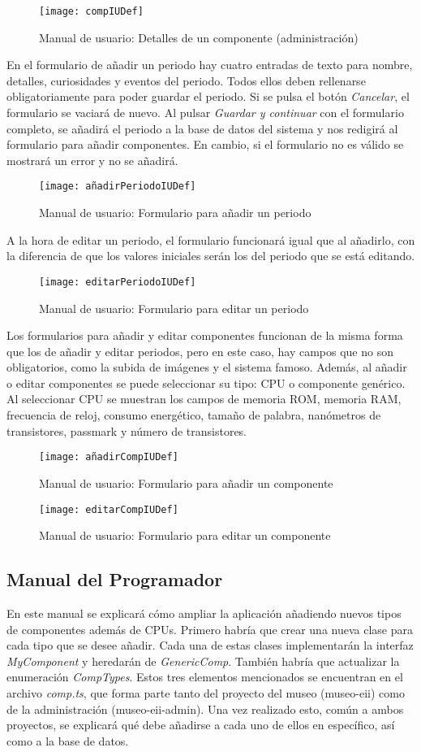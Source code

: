 \begin{figure}[H]
\centering
\texttt{[image: compIUDef]}
\caption{Manual de usuario: Detalles de un componente (administración)}
\end{figure}
En el formulario de añadir un periodo hay cuatro entradas de texto para nombre, detalles, curiosidades y eventos del periodo. Todos ellos deben rellenarse obligatoriamente para poder guardar el periodo. Si se pulsa el botón \textit{Cancelar}, el formulario se vaciará de nuevo. Al pulsar \textit{Guardar y continuar} con el formulario completo, se añadirá el periodo a la base de datos del sistema y nos redigirá al formulario para añadir componentes. En cambio, si el formulario no es válido se mostrará un error y no se añadirá.
\begin{figure}[H]
\centering
\texttt{[image: añadirPeriodoIUDef]}
\caption{Manual de usuario: Formulario para añadir un periodo}
\end{figure}
A la hora de editar un periodo, el formulario funcionará igual que al añadirlo, con la diferencia de que los valores iniciales serán los del periodo que se está editando.
\begin{figure}[H]
\centering
\texttt{[image: editarPeriodoIUDef]}
\caption{Manual de usuario: Formulario para editar un periodo}
\end{figure}
Los formularios para añadir y editar componentes funcionan de la misma forma que los de añadir y editar periodos, pero en este caso, hay campos que no son obligatorios, como la subida de imágenes y el sistema famoso. Además, al añadir o editar componentes se puede seleccionar su tipo: CPU o componente genérico. Al seleccionar CPU se muestran los campos de memoria ROM, memoria RAM, frecuencia de reloj, consumo energético, tamaño de palabra, nanómetros de transistores, passmark y número de transistores.
\begin{figure}[H]
\centering
\texttt{[image: añadirCompIUDef]}
\caption{Manual de usuario: Formulario para añadir un componente}
\end{figure}
\begin{figure}[H]
\centering
\texttt{[image: editarCompIUDef]}
\caption{Manual de usuario: Formulario para editar un componente}
\end{figure}


\subsection{Manual del Programador}
En este manual se explicará cómo ampliar la aplicación añadiendo nuevos tipos de componentes además de CPUs. Primero habría que crear una nueva clase para cada tipo que se desee añadir. Cada una de estas clases implementarán la interfaz \textit{MyComponent} y heredarán de \textit{GenericComp}. También habría que actualizar la enumeración \textit{CompTypes}. Estos tres elementos mencionados se encuentran en el archivo \textit{comp.ts}, que forma parte tanto del proyecto del museo (museo-eii) como de la administración (museo-eii-admin). Una vez realizado esto, común a ambos proyectos, se explicará qué debe añadirse a cada uno de ellos en específico, así como a la base de datos.

